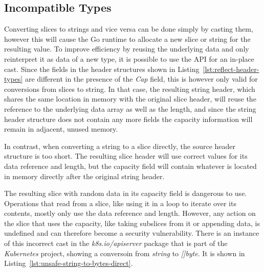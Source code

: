 
\subsection{Incompatible Types}\label{subsec:unsafe-security-problems:slice-casts:incompatible-types}

Converting slices to strings and vice versa can be done simply by casting them, however this will cause the Go runtime
to allocate a new slice or string for the resulting value.
To improve efficiency by reusing the underlying data and only reinterpret it as data of a new type, it is possible to
use the \unsafe{} \acrshort{API} for an in-place cast.
Since the fields in the header structures shown in Listing~\ref{lst:reflect-header-types} are different in the presence
of the \textit{Cap} field, this is however only valid for conversions from slices to string.
In that case, the resulting string header, which shares the same location in memory with the original slice header, will
reuse the reference to the underlying data array as well as the length, and since the string header structure does not
contain any more fields the capacity information will remain in adjacent, unused memory.

In contrast, when converting a string to a slice directly, the source header structure is too short.
The resulting slice header will use correct values for its data reference and length, but the capacity field will
contain whatever is located in memory directly after the original string header.



The resulting slice with random data in its capacity field is dangerous to use.
Operations that read from a slice, like using it in a loop to iterate over its contents, mostly only use the data
reference and length.
However, any action on the slice that uses the capacity, like taking subslices from it or appending data, is undefined
and can therefore become a security vulnerability.
There is an instance of this incorrect cast in the \textit{k8s.io/apiserver} package that is part of the
\textit{Kubernetes} project, showing a conversoin from \textit{string} to \textit{[]byte}.
It is shown in Listing~\ref{lst:unsafe-string-to-bytes-direct}.



